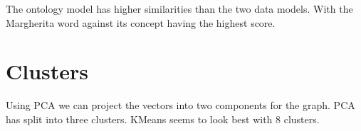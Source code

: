 \documentclass[11pt]{report} %
\begin{document}
The ontology model has higher similarities than the two data models.
With the Margherita word against its concept having the highest score.

\section{Clusters}
Using PCA we can project the vectors into two components for the graph.
PCA has split into three clusters.
KMeans seems to look best with 8 clusters.
\end{document}
